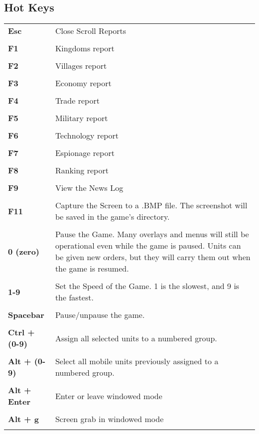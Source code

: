 \subsection{Hot Keys}


\begin{tabular}{p{1in} p{3in}}
	\textbf{Esc} & Close Scroll Reports \\ \\
	\textbf{F1} & Kingdoms report \\ \\
	\textbf{F2} & Villages report \\ \\
	\textbf{F3} & Economy report \\ \\
	\textbf{F4} & Trade report \\\\
	\textbf{F5} & Military report \\ \\
	\textbf{F6} & Technology report \\ \\
	\textbf{F7} & Espionage report \\ \\
	\textbf{F8} & Ranking report \\ \\
	\textbf{F9} & View the News Log \\ \\
	\textbf{F11} & Capture the Screen to a .BMP file. The screenshot will be saved in the game’s directory. \\ \\


	\textbf{0 (zero)} & Pause the Game. Many overlays and menus will still be operational even while the game is paused. Units can be given new orders, but they will carry them out when the game is resumed.\\ \\
	\textbf{1-9} & Set the Speed of the Game. 1 is the slowest, and 9 is the fastest. \\ \\	
	\textbf{Spacebar} & Pause/unpause the game.\\ \\	
	\textbf{Ctrl + (0-9)} & Assign all selected units to a numbered group.\\ \\
	\textbf{Alt + (0-9)} & Select all mobile units previously assigned to a numbered group.\\ \\
	\textbf{Alt + Enter} & Enter or leave windowed mode\\ \\
	\textbf{Alt + g} & Screen grab in windowed mode\\ \\
\end{tabular}

